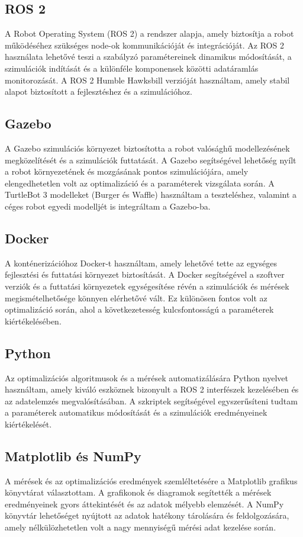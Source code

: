 \subsection{ROS 2}
A Robot Operating System (ROS 2) a rendszer alapja, amely biztosítja a robot működéséhez szükséges node-ok kommunikációját és integrációját. Az ROS 2 használata lehetővé teszi a szabályzó paramétereinek dinamikus módosítását, a szimulációk indítását és a különféle komponensek közötti adatáramlás monitorozását. A ROS 2 Humble Hawksbill verzióját használtam, amely stabil alapot biztosított a fejlesztéshez és a szimulációhoz.

\subsection{Gazebo}
A Gazebo szimulációs környezet biztosította a robot valósághű modellezésének megközelítését és a szimulációk futtatását. A Gazebo segítségével lehetőség nyílt a robot környezetének és mozgásának pontos szimulációjára, amely elengedhetetlen volt az optimalizáció és a paraméterek vizsgálata során. A TurtleBot 3 modelleket (Burger és Waffle) használtam a teszteléshez, valamint a céges robot egyedi modelljét is integráltam a Gazebo-ba.

\subsection{Docker}
A konténerizációhoz Docker-t használtam, amely lehetővé tette az egységes fejlesztési és futtatási környezet biztosítását. A Docker segítségével a szoftver verziók és a futtatási környezetek egységesítése révén a szimulációk és mérések megismételhetősége könnyen elérhetővé vált. Ez különösen fontos volt az optimalizáció során, ahol a következetesség kulcsfontosságú a paraméterek kiértékelésében.

\subsection{Python}
Az optimalizációs algoritmusok és a mérések automatizálására Python nyelvet használtam, amely kiváló eszköznek bizonyult a ROS 2 interfészek kezelésében és az adatelemzés megvalósításában. A szkriptek segítségével egyszerűsíteni tudtam a paraméterek automatikus módosítását és a szimulációk eredményeinek kiértékelését.

\subsection{Matplotlib és NumPy}
A mérések és az optimalizációs eredmények szemléltetésére a Matplotlib grafikus könyvtárat választottam. A grafikonok és diagramok segítették a mérések eredményeinek gyors áttekintését és az adatok mélyebb elemzését. A NumPy könyvtár lehetőséget nyújtott az adatok hatékony tárolására és feldolgozására, amely nélkülözhetetlen volt a nagy mennyiségű mérési adat kezelése során.

